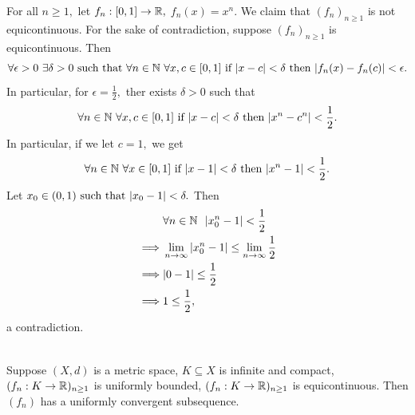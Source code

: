 \begin{example}
    For all $ n \geq 1,$ let $f_n:[0,1] \to \mathbb{R},$ $f_n(x) = x^n.$ We claim that $(f_n)_{n\geq 1}$ is not equicontinuous. For the sake of contradiction, suppose $(f_n)_{n\geq 1}$ is equicontinuous. Then
    \[\forall \epsilon > 0 ~\exists \delta > 0 \text{ such that } \forall n \in \mathbb{N} ~\forall x ,c \in [0,1] \text{ if $|x-c| < \delta$ then $|f_n(x) - f_n(c)| < \epsilon.$}\]
    In particular, for $\epsilon = \frac{1}{2},$ ther exists $\delta > 0$ such that 
    \[\forall n \in \mathbb{N} ~\forall x, c \in [0,1] \text{ if $|x-c| < \delta$ then $|x^n - c^n| < \frac{1}{2}.$}\]
    In particular, if we let $c = 1,$ we get
    \[\forall n \in \mathbb{N} ~\forall x\in [0,1] \text{ if $|x-1| < \delta$ then $|x^n - 1| < \frac{1}{2}.$}\]
    Let $x_0 \in (0,1) \text{ such that } |x_0 - 1| < \delta.$ Then
    \begin{align*}
        &\forall n \in \mathbb{N} ~~|x_0^n - 1| < \frac{1}{2} \\
        \implies &\lim_{n\to \infty} |x_0^n -1| \leq \lim_{n\to \infty} \frac{1}{2} \\
        \implies &|0-1| \leq \frac{1}{2} \\
        \implies &1 \leq \frac{1}{2},
    \end{align*}
    a contradiction.
\end{example}

\begin{theorem} \leavevmode \\
    \label{thm7.25}
    Suppose $(X, d)$ is a metric space, $K\subseteq X$ is infinite and compact, $(f_n: K \to \mathbb{R})_{n\geq 1}$ is uniformly bounded, $(f_n: K \to \mathbb{R})_{n\geq 1}$ is equicontinuous. Then $(f_n)$ has a uniformly convergent subsequence.
\end{theorem}

